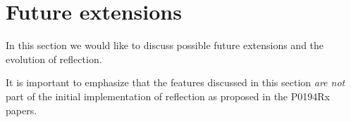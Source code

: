 \section{Future extensions}

In this section we would like to discuss possible future
extensions and the evolution of reflection.

It is important to emphasize that the features discussed
in this section {\em are not} part of the initial implementation
of reflection as proposed in the P0194Rx papers.








